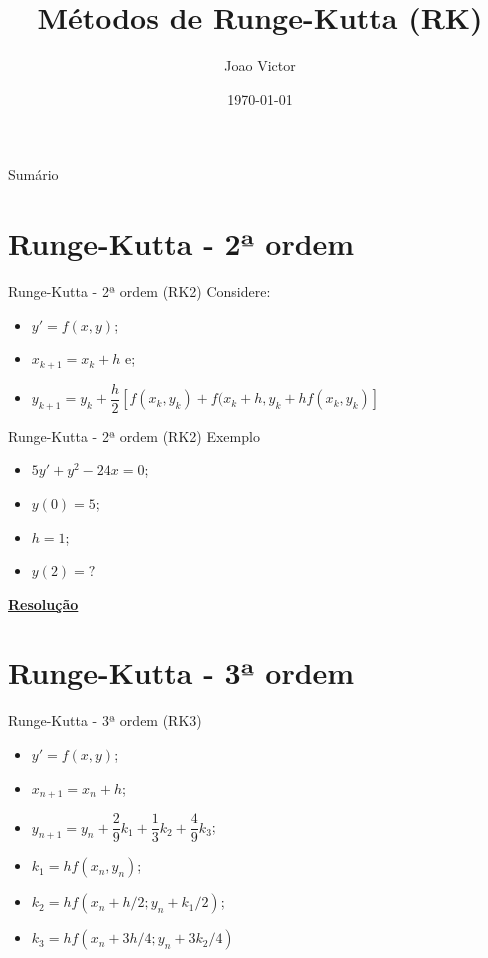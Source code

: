 \documentclass[12pt]{beamer}
\author[Joao Victor]{Joao Victor}
\title[Métodos RK]{Métodos de Runge-Kutta (RK)}
\institute[]{Instituto Federal do Amazonas}
\date{\today}
\begin{document}
\justifying
\onehalfspacing

\maketitle

\begin{frame}{Sumário}
	\tableofcontents
\end{frame}

\section{Runge-Kutta - 2ª ordem}

	\begin{frame}{Runge-Kutta - 2ª ordem (RK2)}
		Considere:
		\begin{itemize}
			\item $y' = f(x,y)$;
			\item $x_{k+1}=x_{k}+h$ e;
			\item $y_{k+1}=y_{k}+\dfrac{h}{2}\left[ f(x_{k},y_{k})+f(x_{k}+h,y_{k}+hf(x_{k},y_{k}) \right]$
		\end{itemize}
	\end{frame}
	
	\begin{frame}{Runge-Kutta - 2ª ordem (RK2)}
		Exemplo
		\begin{itemize}
			\item $5y'+y^{2}-24x=0$;
			\item $y(0)=5$;
			\item $h=1$;
			\item $y(2)=?$
		\end{itemize}
		
		\textcolor{red}{\href{https://drive.google.com/file/d/1sQHxH4YHGEO52ivx2qX4CVqBO1omz_dx/view?usp=sharing}{\textbf{Resolução}}}
	\end{frame}

\section{Runge-Kutta - 3ª ordem}

	\begin{frame}{Runge-Kutta - 3ª ordem (RK3)}
		\begin{itemize}
			\item $y'=f(x,y)$;
			\item $x_{n+1}=x_ {n}+h$;
			\item $y_{n+1}=y_{n}+\dfrac{2}{9}k_{1}+\dfrac{1}{3}k_{2}+
			\dfrac{4}{9}k_{3}$;
			\item $k_{1}=hf(x_{n},y_{n})$;
			\item $k_{2}=hf(x_{n}+{h}/{2};y_{n}+{k_{1}}/{2})$;
			\item $k_{3}=hf(x_{n}+{3h}/{4};y_{n}+{3k_{2}}/{4})$
		\end{itemize}
	\end{frame}
	
\end{document}
